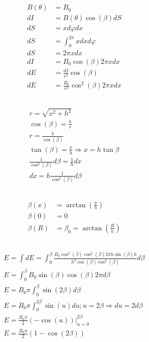\documentclass[a4paper,12pt]{article}
\begin{document}
\subsection{}
\begin{align}
    B(\theta) & = B_0 \\
    dI & = B(\theta) \cos(\beta) dS \\
    dS & = x d\varphi dx \\
    dS & = \int_0^{2 \pi} x dx d\varphi \\
    dS & = 2 \pi x dx \\
    dI & = B_0 \cos(\beta) 2 \pi x dx \\
    dE & = \frac{dI}{r^2} \cos(\beta) \\
    dE & = \frac{B_0}{r^2} \cos^2(\beta) 2 \pi x dx
\end{align}

\subsection{}
\begin{align}
    r = \sqrt{x^2 + h^2} \\
    \cos(\beta) = \frac{h}{r} \\
    r = \frac{h}{\cos(\beta)} \\
    \tan(\beta)  = \frac{x}{h} \Rightarrow x = h \tan{\beta} \\
    \frac{1}{\cos^2(\beta)} d \beta = \frac{1}{h} dx \\
    dx = h \frac{1}{\cos^2(\beta)} d\beta
\end{align}

\subsection{}
\begin{align}
    \beta(x) & = \arctan\left(\frac{x}{h}\right) \\
    \beta(0) & = 0 \\
    \beta(R) & = \beta_0 = \arctan\left(\frac{R}{h}\right)
\end{align}

\subsection{}
\begin{align}
    E = \int dE = \int_0^{\beta} \frac{B_0 \cos^2(\beta) \cos^2(\beta) 2\pi h \sin(\beta) h}{h^2 \cos(\beta) \cos^2(\beta)} d\beta \\
    E = \int_0^\beta B_0 \sin(\beta) \cos(\beta) 2 \pi d\beta \\
    E = B_0 \pi \int_0^{\beta} \sin(2 \beta) d\beta \\
    E = B_0 \pi \int_0^{2 \beta} \sin(u) du; u = 2\beta \Rightarrow du = 2 d\beta \\
    E = \frac{B_0 \pi}{2} (-\cos(u)) \vert_{u=0}^{2\beta} \\
    E = \frac{B_0 \pi}{2} (1 - \cos(2\beta)) \\
\end{align}
\end{document}
